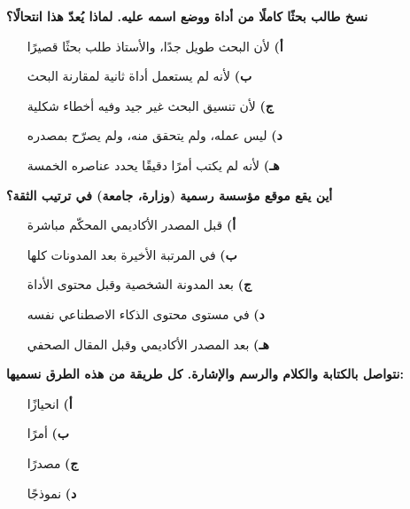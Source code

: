 \documentclass[11pt,a4paper]{article}
\begin{document}
\begin{multicols}{2}
\begin{minipage}{\linewidth}
\hangindent=0.7cm\textbf{نسخ طالب بحثًا كاملًا من أداة ووضع اسمه عليه. لماذا يُعدّ هذا انتحالًا؟}
\begin{itemize}[leftmargin=0.95cm, labelsep=4pt, itemsep=0pt, topsep=2pt, parsep=0pt]
  \item[\textbf{أ)}] لأن البحث طويل جدًا، والأستاذ طلب بحثًا قصيرًا
  \item[\textbf{ب)}] لأنه لم يستعمل أداة ثانية لمقارنة البحث
  \item[\textbf{ج)}] لأن تنسيق البحث غير جيد وفيه أخطاء شكلية
  \item[\textbf{د)}] ليس عمله، ولم يتحقق منه، ولم يصرّح بمصدره
  \item[\textbf{هـ)}] لأنه لم يكتب أمرًا دقيقًا يحدد عناصره الخمسة
\end{itemize}
\end{minipage}\par\vspace{7pt plus 4pt}
\noindent\begin{minipage}{\linewidth}
\hangindent=0.7cm\textbf{أين يقع موقع مؤسسة رسمية (وزارة، جامعة) في ترتيب الثقة؟}
\begin{itemize}[leftmargin=0.95cm, labelsep=4pt, itemsep=0pt, topsep=2pt, parsep=0pt]
  \item[\textbf{أ)}] قبل المصدر الأكاديمي المحكّم مباشرة
  \item[\textbf{ب)}] في المرتبة الأخيرة بعد المدونات كلها
  \item[\textbf{ج)}] بعد المدونة الشخصية وقبل محتوى الأداة
  \item[\textbf{د)}] في مستوى محتوى الذكاء الاصطناعي نفسه
  \item[\textbf{هـ)}] بعد المصدر الأكاديمي وقبل المقال الصحفي
\end{itemize}
\end{minipage}\par\vspace{7pt plus 4pt}
\noindent\begin{minipage}{\linewidth}
\hangindent=0.7cm\textbf{نتواصل بالكتابة والكلام والرسم والإشارة. كل طريقة من هذه الطرق نسميها:}
\begin{itemize}[leftmargin=0.95cm, labelsep=4pt, itemsep=0pt, topsep=2pt, parsep=0pt]
  \item[\textbf{أ)}] انحيازًا
  \item[\textbf{ب)}] أمرًا
  \item[\textbf{ج)}] مصدرًا
  \item[\textbf{د)}] نموذجًا

\end{itemize}
\end{minipage}
\end{multicols}
\end{document}
